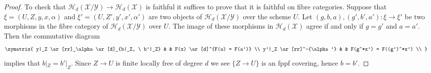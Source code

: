 \begin{proof}
To check that
$\mathcal{H}_d(\mathcal{X}/\mathcal{Y}) \to \mathcal{H}_d(\mathcal{X})$
is faithful it suffices to prove that it is faithful on fibre categories.
Suppose that $\xi = (U, Z, y, x, \alpha)$ and $\xi' = (U, Z', y', x', \alpha')$
are two objects of $\mathcal{H}_d(\mathcal{X}/\mathcal{Y})$ over the
scheme $U$. Let $(g, b, a), (g', b', a') : \xi \to \xi'$ be two morphisms
in the fibre category of $\mathcal{H}_d(\mathcal{X}/\mathcal{Y})$ over $U$.
The image of these morphisms in $\mathcal{H}_d(\mathcal{X})$ agree
if and only if $g = g'$ and $a = a'$. Then the commutative diagram
$$
\xymatrix{
y|_Z \ar[rr]_\alpha \ar[d]_{b|_Z, \ b'|_Z} & &
F(x) \ar[d]^{F(a) = F(a')} \\
y'|_Z \ar[rr]^-{\alpha'} & &
F(g^*x') = F((g')^*x') \\
}
$$
implies that $b|_Z = b'|_Z$. Since $Z \to U$ is finite locally free of degree
$d$ we see $\{Z \to U\}$ is an fppf covering, hence $b = b'$.
\end{proof}


















